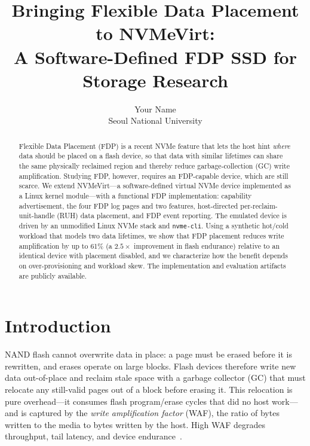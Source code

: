 \documentclass[letterpaper,twocolumn,10pt]{article}
\begin{document}

\date{}

\title{\Large \bf Bringing Flexible Data Placement to NVMeVirt:\\
  A Software-Defined FDP SSD for Storage Research}

\author{
{\rm Your Name}\\
Seoul National University
}

\maketitle

\begin{abstract}
Flexible Data Placement (FDP) is a recent NVMe feature that lets the host hint
\emph{where} data should be placed on a flash device, so that data with similar
lifetimes can share the same physically reclaimed region and thereby reduce
garbage-collection (GC) write amplification. Studying FDP, however, requires an
FDP-capable device, which are still scarce. We extend NVMeVirt---a
software-defined virtual NVMe device implemented as a Linux kernel
module---with a functional FDP implementation: capability advertisement, the
four FDP log pages and two features, host-directed per-reclaim-unit-handle
(RUH) data placement, and FDP event reporting. The emulated device is driven by
an unmodified Linux NVMe stack and \texttt{nvme-cli}. Using a synthetic
hot/cold workload that models two data lifetimes, we show that FDP placement
reduces write amplification by up to 61\% (a $2.5\times$ improvement in flash
endurance) relative to an identical device with placement disabled, and we
characterize how the benefit depends on over-provisioning and workload skew.
The implementation and evaluation artifacts are publicly available.
\end{abstract}

\section{Introduction}
NAND flash cannot overwrite data in place: a page must be erased before it is
rewritten, and erases operate on large blocks. Flash devices therefore write
new data out-of-place and reclaim stale space with a garbage collector (GC)
that must relocate any still-valid pages out of a block before erasing it. This
relocation is pure overhead---it consumes flash program/erase cycles that did
no host work---and is captured by the \emph{write amplification factor} (WAF),
the ratio of bytes written to the media to bytes written by the host. High WAF
degrades throughput, tail latency, and device endurance~\cite{arpachiDusseau18:osbook}.
\end{document}
